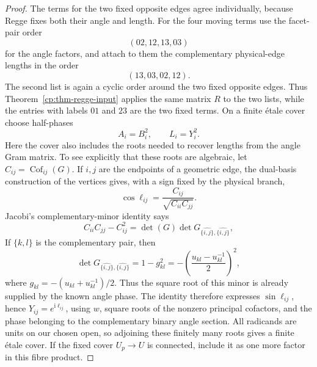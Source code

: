 \begin{proof}
The terms for the two fixed opposite edges agree individually, because
Regge fixes both their angle and length.  For the four moving terms use the
facet-pair order
\[
 (02,12,13,03)
\]
for the angle factors, and attach to them the complementary physical-edge
lengths in the order
\[
 (13,03,02,12).
\]
The second list is again a cyclic order around the two fixed opposite
edges.  Thus Theorem~\ref{cp:thm-regge-input} applies the same matrix \(R\)
to the two lists, while the entries with labels \(01\) and \(23\) are the
two fixed terms.  On a finite \'{e}tale cover choose half-phases
\[
 A_i=B_i^2,
 \qquad L_i=Y_i^2.
\]
Here the cover also includes the roots needed to recover lengths from the
angle Gram matrix.  To see explicitly that these roots are algebraic, let
\(C_{ij}=\operatorname{Cof}_{ij}(G)\).  If \(i,j\) are the endpoints of a
geometric edge, the dual-basis construction of the vertices gives, with a
sign fixed by the physical branch,
\[
 \cos\ell_{ij}
   =\frac{C_{ij}}{\sqrt{C_{ii}C_{jj}}}.
\]
Jacobi's complementary-minor identity says
\[
 C_{ii}C_{jj}-C_{ij}^2
 =\det(G)\det G_{\widehat{\{i,j\}},\widehat{\{i,j\}}},
\]
If \(\{k,l\}\) is the complementary pair, then
\[
 \det G_{\widehat{\{i,j\}},\widehat{\{i,j\}}}
 =1-g_{kl}^2
 =-\left(\frac{u_{kl}-u_{kl}^{-1}}2\right)^2,
\]
where \(g_{kl}=-(u_{kl}+u_{kl}^{-1})/2\).  Thus the square root of this
minor is already supplied by the known angle phase.  The identity therefore
expresses \(\sin\ell_{ij}\), hence
\(Y_{ij}=e^{\mathrm i\ell_{ij}}\), using \(w\), square roots of the
nonzero principal cofactors, and the phase belonging to the complementary
binary angle section.  All radicands are units on our chosen open, so
adjoining these finitely many roots gives a finite \'{e}tale cover.  If the
fixed cover \(U_p\to U\) is connected, include it as one more factor in
this fibre product.


\end{proof}
